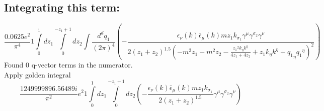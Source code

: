 \subsection*{Integrating this term:}
\begin{dmath}\frac{0.0625 e^{2}}{\pi^{4}}1\int\limits_{ 0 }^{ 1 } d{ z_{ 1 } }\int\limits_{ 0 }^{ - { z_{ 1 } } + 1 } d{ z_{ 2 } }\int\frac{d^d q_1 }{ (2\pi)^4 }\left(- \frac{\epsilon_{ \nu }({ k }) \bar{\epsilon}_{ \mu }({ k }) m { z_{ 1 } } { { k }_{ \sigma_1 } } { \gamma^{ \mu } } { \gamma^{ \sigma_2 } } { \gamma^{ \nu } }}{2 \left({ z_{ 1 } } + { z_{ 2 } }\right)^{1.5} \left(- m^{2} { z_{ 1 } } - m^{2} { z_{ 2 } } - \frac{{ z_{ 1 } }^{2} { { k }_{ \eta } } { { k }^{ \eta } }}{4 { z_{ 1 } } + 4 { z_{ 2 } }} + { z_{ 1 } } { { k }_{ \eta } } { { k }^{ \eta } } + { { q_1 }_{ \eta } } { { q_1 }^{ \eta } }\right)^{2}}\right)\end{dmath}
Found 0 q-vector terms in the numerator.\\
Apply golden integral
\begin{dmath}\frac{1249999896.56489 i}{\pi^{2}} e^{2}1\int\limits_{ 0 }^{ 1 } d{ z_{ 1 } }\int\limits_{ 0 }^{ - { z_{ 1 } } + 1 } d{ z_{ 2 } }\left(- \frac{\epsilon_{ \nu }({ k }) \bar{\epsilon}_{ \mu }({ k }) m { z_{ 1 } } { { k }_{ \sigma_1 } }}{2 \left({ z_{ 1 } } + { z_{ 2 } }\right)^{1.5}} { \gamma^{ \mu } } { \gamma^{ \sigma_2 } } { \gamma^{ \nu } }\right)\end{dmath}
